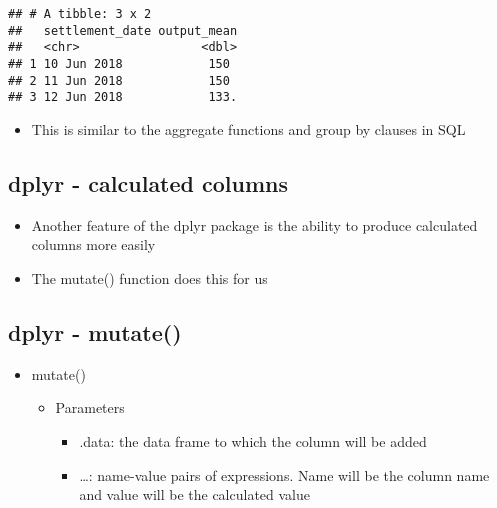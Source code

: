 \documentclass[]{article}
\newenvironment{Shaded}{\begin{snugshade}}{\end{snugshade}}
\newcommand{\KeywordTok}[1]{\textcolor[rgb]{0.13,0.29,0.53}{\textbf{#1}}}
\newcommand{\DataTypeTok}[1]{\textcolor[rgb]{0.13,0.29,0.53}{#1}}
\newcommand{\StringTok}[1]{\textcolor[rgb]{0.31,0.60,0.02}{#1}}
\newcommand{\OperatorTok}[1]{\textcolor[rgb]{0.81,0.36,0.00}{\textbf{#1}}}
\newcommand{\NormalTok}[1]{#1}
\providecommand{\tightlist}{%
  \setlength{\itemsep}{0pt}\setlength{\parskip}{0pt}}
\begin{document}
\begin{Shaded}
\end{Shaded}

\begin{verbatim}
## # A tibble: 3 x 2
##   settlement_date output_mean
##   <chr>                 <dbl>
## 1 10 Jun 2018            150 
## 2 11 Jun 2018            150 
## 3 12 Jun 2018            133.
\end{verbatim}

\begin{itemize}
\tightlist
\item
  This is similar to the aggregate functions and group by clauses in SQL
\end{itemize}

\subsection{dplyr - calculated
columns}\label{dplyr---calculated-columns}

\begin{itemize}
\tightlist
\item
  Another feature of the dplyr package is the ability to produce
  calculated columns more easily
\item
  The mutate() function does this for us
\end{itemize}

\subsection{dplyr - mutate()}\label{dplyr---mutate}

\begin{itemize}
\tightlist
\item
  mutate()

  \begin{itemize}
  \tightlist
  \item
    Parameters

    \begin{itemize}
    \tightlist
    \item
      .data: the data frame to which the column will be added
    \item
      \ldots{}: name-value pairs of expressions. Name will be the column
      name and value will be the calculated value
    \end{itemize}
  \end{itemize}
\end{itemize}
\end{document}
